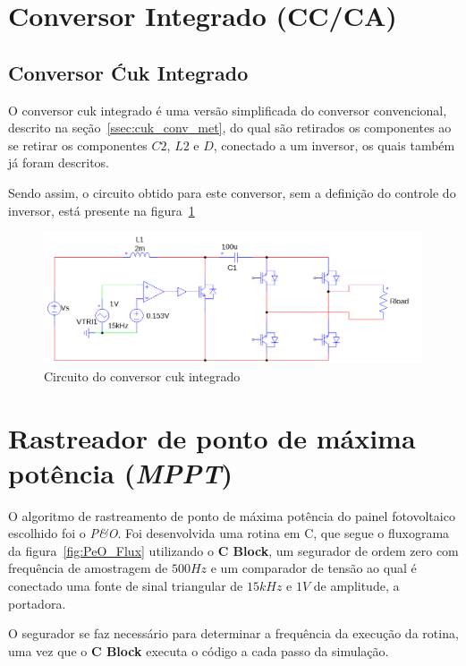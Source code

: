 \documentclass[
	12pt,				%
	openright,			%
	onseside,
	a4paper,			%
	english,			%
	french,				%
	spanish,			%
	brazil,				%
	]{abntex2}
\begin{document}
\section{Conversor Integrado (CC/CA)}\label{sec:met_conv_integ}
\subsection{Conversor Ćuk Integrado}

O conversor cuk integrado é uma versão simplificada do conversor convencional, descrito na seção~\ref{ssec:cuk_conv_met}, do qual são retirados os componentes ao se retirar os componentes $C2$, $L2$ e $D$, conectado a um inversor, os quais também já foram descritos.

Sendo assim, o circuito obtido para este conversor, sem a definição do controle do inversor, está presente na figura~\ref{fig:integ_cuk_met}

\begin{figure}[htbp]%
	\begin{center}%
		\includegraphics[width=0.75 \linewidth]{integ_cuk_circ_psim}
		\caption{Circuito do conversor cuk integrado}
		\label{fig:integ_cuk_met}
	\end{center}
\end{figure}

\section{Rastreador de ponto de máxima potência (\textit{MPPT})}\label{sec:met_mppt}

O algoritmo de rastreamento de ponto de máxima potência do painel fotovoltaico escolhido foi o \textit{P\&O}. Foi desenvolvida uma rotina em C, que segue o fluxograma da figura~\ref{fig:PeO_Flux} utilizando o \textbf{C Block}, um segurador de ordem zero com frequência de amostragem de $500Hz$ e um comparador de tensão ao qual é conectado uma fonte de sinal triangular de $15kHz$ e $1V$ de amplitude, a portadora.

O segurador se faz necessário para determinar a frequência da execução da rotina, uma vez que o \textbf{C Block} executa o código a cada passo da simulação.
\end{document}
